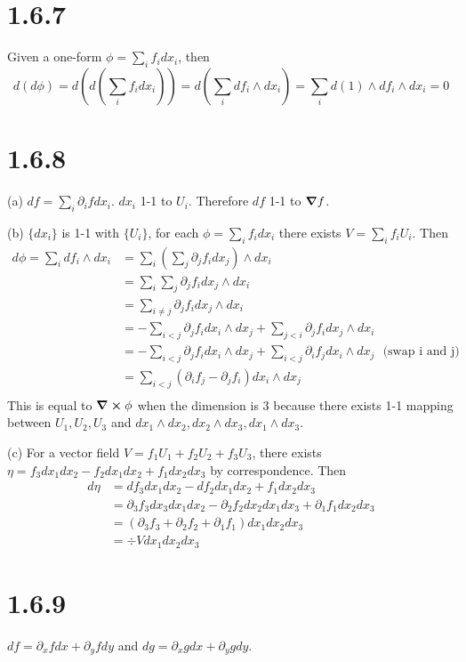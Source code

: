 \documentclass[12pt]{article}
\begin{document}
\section*{1.6.7}
Given a one-form $\phi = \sum_i f_i dx_i$, then  $$d(d\phi) = d(d(\sum_i f_i dx_i)) = d(\sum_i df_i \wedge dx_i) = \sum_i d(1)\wedge df_i \wedge dx_i = 0$$

\section*{1.6.8}
(a) $df = \sum_i \partial_i f dx_i$. $dx_i$ 1-1 to $U_i$. Therefore $df$ 1-1 to $\grad f$.

(b) $\{dx_i\}$ is 1-1 with $\{U_i\}$, for each $\phi = \sum_i f_i dx_i$ there exists $V= \sum_i f_i U_i$.  Then $$\begin{aligned}
	d\phi = \sum_i df_i \wedge dx_i &= \sum_i (\sum_j \partial_j f_i dx_j ) \wedge dx_i \\
	  &= \sum_i \sum_j \partial_j f_i dx_j \wedge dx_i \\
	  &= \sum_{i\neq j} \partial_j f_i dx_j \wedge dx_i \\
	  &= - \sum_{i < j} \partial_j f_i dx_i \wedge dx_j  +  \sum_{j < i} \partial_j f_i dx_j \wedge dx_i \\ 
	  &= - \sum_{i < j} \partial_j f_i dx_i \wedge dx_j  +  \sum_{i < j} \partial_i f_j dx_i \wedge dx_j \ \ \ \mbox{(swap i and j)}\\ 
	  &= \sum_{i < j} (\partial_i f_j - \partial_j f_i )dx_i \wedge dx_j  \\ 
\end{aligned} $$
This is equal to $\curl \phi$ when the dimension is 3 because there exists 1-1 mapping between $U_1,U_2,U_3$ and $dx_1\wedge dx_2, dx_2 \wedge dx_3, dx_1 \wedge dx_3$.

(c) For a vector field $V = f_1U_1+f_2U_2+f_3U_3$, there exists $\eta = f_3 dx_1dx_2  - f_2dx_1dx_2 + f_1dx_2dx_3$ by correspondence. Then 
$$
 \begin{aligned}
 	d\eta &= df_3 dx_1 dx_2 - df_2 dx_1 dx_2 + f_1 dx_2 dx_3 \\
 		  &= \partial_3 f_3 dx_3 dx_1 dx_2 - \partial_2 f_2 dx_2 dx_1 dx_3 + \partial_1 f_1 dx_2 dx_3 \\
 		  &= (\partial_3 f_3 + \partial_2 f_2 + \partial_1 f_1) dx_1 dx_2 dx_3 \\
 		  &= \div V dx_1 dx_2 dx_3
 \end{aligned}
$$


\section*{1.6.9}
$df = \partial_x f dx + \partial_y f dy$ and $dg = \partial_x g dx + \partial_y g dy$.
\end{document}
